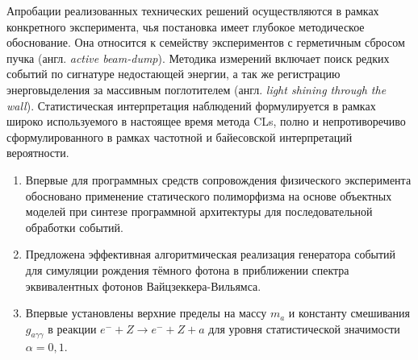 Апробации реализованных технических решений осуществляются в рамках
конкретного эксперимента, чья постановка имеет глубокое методическое
обоснование. Она относится к семейству экспериментов с герметичным
сбросом пучка (англ. \emph{active beam-dump}). Методика измерений
включает поиск редких событий по сигнатуре недостающей энергии, а так
же регистрацию энерговыделения за массивным
поглотителем (англ. \emph{light shining through the wall}).
Статистическая интерпретация наблюдений формулируется
в рамках широко используемого в настоящее время метода CLs,
полно и непротиворечиво сформулированного в рамках частотной и байесовской
интерпретаций вероятности.

{\novelty}
\begin{enumerate}[beginpenalty=10000]
    \item Впервые для программных средств сопровождения
    физического эксперимента обосновано применение статического
    полиморфизма на основе объектных моделей
    при синтезе программной архитектуры для последовательной
    обработки событий.
    \item Предложена эффективная алгоритмическая
    реализация генератора событий для симуляции
    рождения тёмного фотона в приближении спектра эквивалентных
    фотонов Вайцзеккера-Вильямса.
    \item Впервые установлены верхние пределы на массу $m_a$ и константу
    смешивания $g_{a\gamma\gamma}$ в реакции $e^- + Z \to e^- + Z + a$
    для уровня статистической значимости $\alpha = 0{,}1$.
\end{enumerate}




